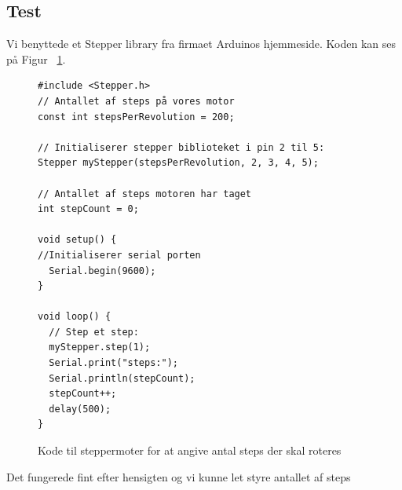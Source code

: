 \subsection{Test}
Vi benyttede et Stepper library fra firmaet Arduinos hjemmeside\cite{steppercode:stepbystep}. Koden kan ses på Figur ~\ref{fig:steptest}. 

\begin{figure}[H] \label{fig:steptest}
\caption{Kode til steppermoter for at angive antal steps der skal roteres}
\begin{lstlisting}
#include <Stepper.h>
// Antallet af steps på vores motor
const int stepsPerRevolution = 200;  

// Initialiserer stepper biblioteket i pin 2 til 5:
Stepper myStepper(stepsPerRevolution, 2, 3, 4, 5);

// Antallet af steps motoren har taget
int stepCount = 0;         

void setup() {
//Initialiserer serial porten
  Serial.begin(9600);
}

void loop() {
  // Step et step:
  myStepper.step(1);
  Serial.print("steps:");
  Serial.println(stepCount);
  stepCount++;
  delay(500);
}
\end{lstlisting}
\end{figure}

Det fungerede fint efter hensigten og vi kunne let styre antallet af steps

